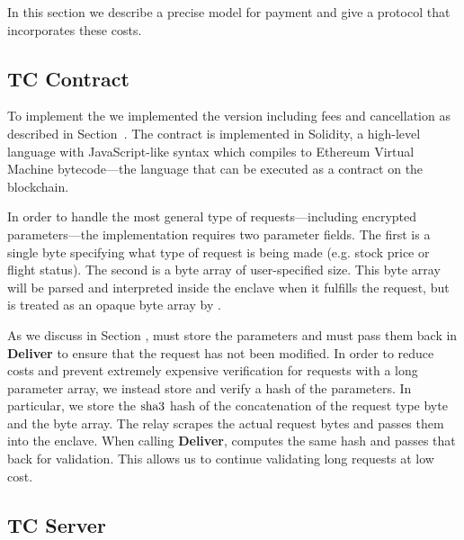 In this section we describe a precise model for payment and give a protocol that incorporates these costs.







\subsection{TC Contract}

To implement the \tcont we implemented the version including fees and cancellation as described in Section~.
The contract is implemented in Solidity, a high-level language with JavaScript-like syntax which compiles to Ethereum Virtual Machine bytecode---the language that can be executed as a contract on the blockchain.

In order to handle the most general type of requests---including encrypted parameters---the \tcont implementation requires two parameter fields.
The first is a single byte specifying what type of request is being made (e.g. stock price or flight status).
The second is a byte array of user-specified size.
This byte array will be parsed and interpreted inside the enclave when it fulfills the request, but is treated as an opaque byte array by \tcont.

As we discuss in Section , \tcont must store the parameters and \tc must pass them back in {\bf Deliver} to ensure that the request has not been modified.
In order to reduce costs and prevent extremely expensive verification for requests with a long parameter array, we instead store and verify a hash of the parameters.
In particular, we store the $\operatorname{\mathrm{sha3}}$ hash of the concatenation of the request type byte and the byte array.
The relay scrapes the actual request bytes and passes them into the enclave.
When calling {\bf Deliver}, \enclaveprog computes the same hash and passes that back for validation.
This allows us to continue validating long requests at low cost.



\subsection{TC Server}


